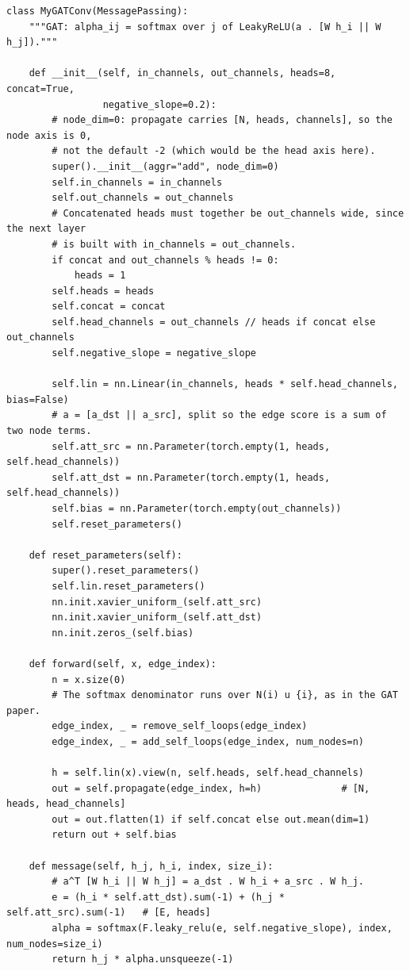 \begin{lstlisting}[style=p1pystyle]
class MyGATConv(MessagePassing):
    """GAT: alpha_ij = softmax over j of LeakyReLU(a . [W h_i || W h_j])."""

    def __init__(self, in_channels, out_channels, heads=8, concat=True,
                 negative_slope=0.2):
        # node_dim=0: propagate carries [N, heads, channels], so the node axis is 0,
        # not the default -2 (which would be the head axis here).
        super().__init__(aggr="add", node_dim=0)
        self.in_channels = in_channels
        self.out_channels = out_channels
        # Concatenated heads must together be out_channels wide, since the next layer
        # is built with in_channels = out_channels.
        if concat and out_channels % heads != 0:
            heads = 1
        self.heads = heads
        self.concat = concat
        self.head_channels = out_channels // heads if concat else out_channels
        self.negative_slope = negative_slope

        self.lin = nn.Linear(in_channels, heads * self.head_channels, bias=False)
        # a = [a_dst || a_src], split so the edge score is a sum of two node terms.
        self.att_src = nn.Parameter(torch.empty(1, heads, self.head_channels))
        self.att_dst = nn.Parameter(torch.empty(1, heads, self.head_channels))
        self.bias = nn.Parameter(torch.empty(out_channels))
        self.reset_parameters()

    def reset_parameters(self):
        super().reset_parameters()
        self.lin.reset_parameters()
        nn.init.xavier_uniform_(self.att_src)
        nn.init.xavier_uniform_(self.att_dst)
        nn.init.zeros_(self.bias)

    def forward(self, x, edge_index):
        n = x.size(0)
        # The softmax denominator runs over N(i) u {i}, as in the GAT paper.
        edge_index, _ = remove_self_loops(edge_index)
        edge_index, _ = add_self_loops(edge_index, num_nodes=n)

        h = self.lin(x).view(n, self.heads, self.head_channels)
        out = self.propagate(edge_index, h=h)              # [N, heads, head_channels]
        out = out.flatten(1) if self.concat else out.mean(dim=1)
        return out + self.bias

    def message(self, h_j, h_i, index, size_i):
        # a^T [W h_i || W h_j] = a_dst . W h_i + a_src . W h_j.
        e = (h_i * self.att_dst).sum(-1) + (h_j * self.att_src).sum(-1)   # [E, heads]
        alpha = softmax(F.leaky_relu(e, self.negative_slope), index, num_nodes=size_i)
        return h_j * alpha.unsqueeze(-1)
\end{lstlisting}

